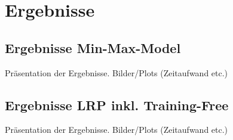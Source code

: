 \chapter{Ergebnisse}
\section{Ergebnisse Min-Max-Model}
Präsentation der Ergebnisse. Bilder/Plots (Zeitaufwand etc.)

\section{Ergebnisse LRP inkl. Training-Free}
Präsentation der Ergebnisse. Bilder/Plots (Zeitaufwand etc.)